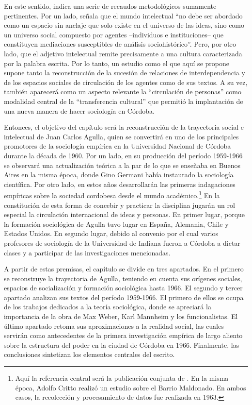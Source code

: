 En este sentido, \textcite[31]{1510-SAPIRO2017} indica una serie de recaudos metodológicos sumamente pertinentes. Por un lado, señala que el mundo intelectual \enquote{no debe ser abordado como un espacio sin anclaje que solo existe en el universo de las ideas, sino como un universo social compuesto por agentes --individuos e instituciones-- que constituyen mediaciones susceptibles de análisis sociohistórico}. Pero, por otro lado, que el adjetivo intelectual remite precisamente a una cultura caracterizada por la palabra escrita. Por lo tanto, un estudio como el que aquí se propone supone tanto la reconstrucción de la sucesión de relaciones de interdependencia y de los espacios sociales de circulación de los agentes como de sus textos. A su vez, también aparecerá como un aspecto relevante la \enquote{circulación de personas} \parencite[35]{1510-SAPIRO2017} como modalidad central de la \enquote{transferencia cultural} que permitió la implantación de una nueva manera de hacer sociología en Córdoba.

Entonces, el objetivo del capítulo será la reconstrucción de la trayectoria social e intelectual de Juan Carlos Agulla, quien se convertirá en uno de los principales promotores de la sociología empírica en la Universidad Nacional de Córdoba durante la década de 1960. Por un lado, en su producción del período 1959-1966 se observará una actualización teórica a la par de lo que se enseñaba en Buenos Aires en la misma época, donde Gino Germani había instaurado la sociología científica. Por otro lado, en estos años desarrollarán las primeras indagaciones empíricas sobre la sociedad cordobesa desde el mundo académico.\footnote{Aquí la referencia central será la publicación conjunta de \textcite{1633-AGULLA1966}. En la misma época, Adolfo Critto realizó un estudio sobre el Barrio Maldonado. En ambos casos, la recolección y procesamiento de datos fue realizada en 1963.} En la constitución de esta forma de concebir y practicar la disciplina jugarán un rol especial la circulación internacional de ideas y personas. En primer lugar, porque la formación sociológica de Agulla tuvo lugar en España, Alemania, Chile y Estados Unidos. En segundo lugar, debido al convenio por el cual varios profesores de sociología de la Universidad de Indiana fueron a Córdoba a dictar clases y a participar de las investigaciones mencionadas.

A partir de estas premisas, el capítulo se divide en tres apartados. En el primero se reconstruye la trayectoria de Agulla, teniendo en cuenta sus orígenes sociales, espacios de socialización y formación sociológica hasta 1966. El segundo y tercer apartado analizan sus textos del período 1959-1966. El primero de ellos se ocupa de los trabajos dedicados a la teoría sociológica, donde se apreciará la importancia de la obra de Max Weber, Karl Mannheim y los funcionalistas. El último apartado retoma sus aproximaciones a la realidad social, las cuales servirán como antecedentes de la primera investigación empírica de largo aliento sobre la estructura del poder en la ciudad de Córdoba en 1966. Finalmente, las conclusiones sintetizan los elementos centrales del escrito.

